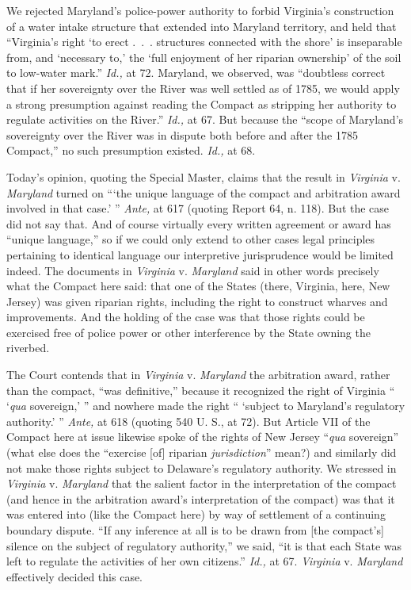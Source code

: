 {  We rejected Maryland's police-power authority to forbid Virginia's
construction of a water intake structure that extended into Maryland
territory, and held that ``Virginia's right ‘to erect .~.~.
structures connected with the shore' is inseparable from, and
‘necessary to,' the ‘full enjoyment of her riparian ownership'
of the soil to low-water mark.'' \emph{Id.,} \newpage  at 72. Maryland,
we observed, was ``doubtless correct that if her sovereignty over the
River was well settled as of 1785, we would apply a strong presumption
against reading the Compact as stripping her authority to regulate
activities on the River.'' \emph{Id.,} at 67. But because the ``scope
of Maryland's sovereignty over the River was in dispute both before
and after the 1785 Compact,'' no such presumption existed. \emph{Id.,}
at 68.

  Today's opinion, quoting the Special Master, claims that the result
in \emph{Virginia} v. \emph{Maryland} turned on ``‘the unique language
of the compact and arbitration award involved in that case.' ''
\emph{Ante,} at 617 (quoting Report 64, n. 118). But the case did not
say that. And of course virtually every written agreement or award
has ``unique language,'' so if we could only extend to other cases
legal principles pertaining to identical language our interpretive
jurisprudence would be limited indeed. The documents in \emph{Virginia}
v. \emph{Maryland} said in other words precisely what the Compact here
said: that one of the States (there, Virginia, here, New Jersey) was
given riparian rights, including the right to construct wharves and
improvements. And the holding of the case was that those rights could be
exercised free of police power or other interference by the State owning
the riverbed.

  The Court contends that in \emph{Virginia} v. \emph{Maryland} the
arbitration award, rather than the compact, ``was definitive,''
because it recognized the right of Virginia `` ‘\emph{qua} sovereign,'
'' and nowhere made the right `` ‘subject to Maryland's regulatory
authority.' '' \emph{Ante,} at 618 (quoting 540 U. S., at 72).
But Article VII of the Compact here at issue likewise spoke of the
rights of New Jersey ``\emph{qua} sovereign'' (what else does the
``exercise [of] riparian \emph{jurisdiction}'' mean?) and similarly did
not make those rights subject to Delaware's regulatory authority.
We stressed in \emph{Virginia} v. \emph{Maryland} that the salient factor
in the interpretation of the compact (and hence in the arbitration
award's interpretation of the compact) was that it was entered into
(like the Compact here) by way of \newpage  settlement of a continuing
boundary dispute. ``If any inference at all is to be drawn from [the
compact's] silence on the subject of regulatory authority,'' we
said, ``it is that each State was left to regulate the activities of
her own citizens.'' \emph{Id.,} at 67. \emph{Virginia} v. \emph{Maryland}
effectively decided this case.

}
